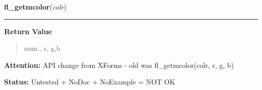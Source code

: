     \label{xformslib:library:fl_getmcolor}

    \vspace{0.5ex}

\hspace{.8\funcindent}\begin{boxedminipage}{\funcwidth}

    \raggedright \textbf{fl\_getmcolor}(\textit{colr})

    \vspace{-1.5ex}

    \rule{\textwidth}{0.5\fboxrule}
\setlength{\parskip}{2ex}
\setlength{\parskip}{1ex}
      \textbf{Return Value}
    \vspace{-1ex}

      \begin{quote}
      num., r, g,b

      \end{quote}

\textbf{Attention:} API change from XForms - old was fl\_getmcolor(colr, r, g, b)



\textbf{Status:} Untested + NoDoc + NoExample = NOT OK



    \end{boxedminipage}

    \label{xformslib:library:fl_get_pixel}

    \vspace{0.5ex}

